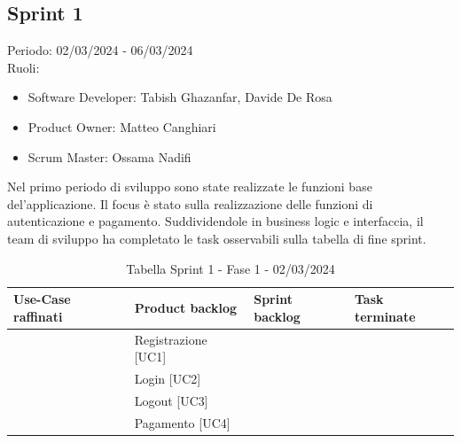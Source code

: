 \documentclass{article}
\begin{document}
\subsection*{Sprint 1}
Periodo: 02/03/2024 - 06/03/2024\vspace*{7pt}\\
Ruoli:
\begin{itemize}[label = { }]
    \itemsep0em
    \item Software Developer: Tabish Ghazanfar, Davide De Rosa
    \item Product Owner: Matteo Canghiari
    \item Scrum Master: Ossama Nadifi
\end{itemize}
Nel primo periodo di sviluppo sono state realizzate le funzioni base del'applicazione. Il focus è stato sulla realizzazione delle funzioni di autenticazione e pagamento. Suddividendole in business logic e interfaccia, il team di sviluppo ha completato le task osservabili sulla tabella di fine sprint.

\begin{table}[h]
    \centering
    \begin{tabularx}{\textwidth}{|X|X|X|X|}
        \hline
        \bf Use-Case raffinati & \bf Product backlog & \bf Sprint backlog & \bf Task terminate \\
        \hline
        & Registrazione [UC1] & & \\
        \hline
        & Login [UC2] & & \\
        \hline
        & Logout [UC3] & & \\
        \hline
        & Pagamento [UC4] &  &  \\
        \hline
    \end{tabularx}
    \caption*{Tabella Sprint 1 - Fase 1 - 02/03/2024}
\end{table}
\end{document}
